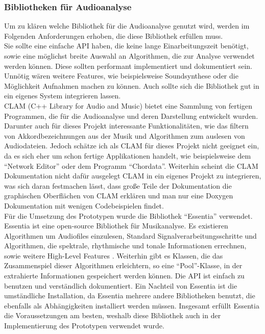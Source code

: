 \documentclass[11pt,a4paper]{article}
\begin{document}
\subsubsection{Bibliotheken für Audioanalyse}
Um zu klären welche Bibliothek für die Audioanalyse genutzt wird, werden im Folgenden Anforderungen erhoben, die diese Bibliothek erfüllen muss.\\
Sie sollte eine einfache API haben, die keine lange Einarbeitungszeit benötigt, sowie eine möglichst breite Auswahl an Algorithmen, die zur Analyse verwendet werden können. Diese sollten performant implementiert und dokumentiert sein. Unnötig wären weitere Features, wie beispielsweise Soundsynthese oder die Möglichkeit Aufnahmen machen zu können. Auch sollte sich die Bibliothek gut in ein eigenes System integrieren lassen.\\
CLAM (C++ Library for Audio and Music) bietet eine Sammlung von fertigen Programmen, die für die Audioanalyse und deren Darstellung entwickelt wurden. Darunter auch für dieses Projekt interessante Funktionalitäten, wie das filtern von Akkordbezeichnungen aus der Musik und Algorithmen zum auslesen von Audiodateien. Jedoch schätze ich als CLAM für dieses Projekt nicht geeignet ein, da es sich eher um schon fertige Applikationen handelt, wie beispielsweise dem ``Network Editor'' oder dem Programm ``Chordata''. Weiterhin scheint die CLAM Dokumentation nicht dafür ausgelegt CLAM in ein eigenes Projekt zu integrieren, was sich daran festmachen lässt, dass große Teile der Dokumentation die graphischen Oberflächen von CLAM erklären und man nur eine Doxygen Dokumentation mit wenigen Codebeispielen findet.\\
Für die Umsetzung des Prototypen wurde die Bibliothek ``Essentia'' verwendet. Essentia ist eine open-source Bibliothek für Musikanalyse. Es existieren Algorithmen um Audiofiles einzulesen, Standard Signalverarbeitungsschritte und Algorithmen, die spektrale, rhythmische und tonale Informationen errechnen, sowie weitere High-Level Features \cite{Bogdanov:2013:EOL:2502081.2502229}. Weiterhin gibt es Klassen, die das Zusammenspiel dieser Algorithmen erleichtern, so eine ``Pool''-Klasse, in der extrahierte Informationen gespeichert werden können. Die API ist einfach zu benutzen und verständlich dokumentiert. Ein Nachteil von Essentia ist die umständliche Installation, da Essentia mehrere andere Bibliotheken benutzt, die ebenfalls als Abhängigkeiten installiert werden müssen. Insgesamt erfüllt Essentia die Voraussetzungen am besten, weshalb diese Bibliothek auch in der Implementierung des Prototypen verwendet wurde.
\end{document}
